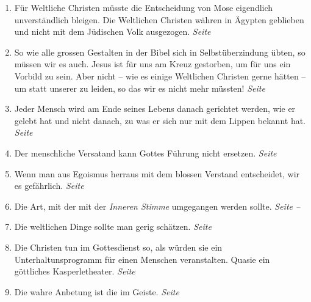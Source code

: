 \begin{enumerate}
 \item Für Weltliche Christen müsste die Entscheidung von Mose eigendlich
unverständlich bleigen. Die Weltlichen Christen währen in Ägypten geblieben und
nicht mit dem Jüdischen Volk ausgezogen.
 \dotfill \textit{Seite \pageref{ref:04_17_mose}}\\
 
 \item So wie alle grossen Gestalten in der Bibel sich in Selbstüberzindung
übten, so müssen wir es auch. Jesus ist für uns am Kreuz gestorben, um für uns
ein Vorbild zu sein. Aber nicht -- wie es einige Weltlichen Christen gerne
hätten -- um statt unserer zu leiden, so das wir es nicht mehr müssten!
 \dotfill \textit{Seite \pageref{ref:04_20_opfertod}}\\
 
 \item Jeder Mensch wird am Ende seines Lebens danach gerichtet werden, wie er
gelebt hat und nicht danach, zu was er sich nur mit dem Lippen bekannt hat.
 \dotfill \textit{Seite \pageref{ref:04_21_gericht}}\\
 
 \item Der menschliche Versatand kann Gottes Führung nicht ersetzen.
 \dotfill \textit{Seite \pageref{ref:04_22_vernunft}}\\
 
 \item Wenn man aus Egoismus herraus mit dem blossen Verstand entscheidet, wir
es gefährlich.
 \dotfill \textit{Seite \pageref{ref:04_22_vernunft_und_ego}}\\
 
 \item Die Art, mit der mit der \textit{Inneren Stimme} umgegangen werden
sollte.
 \dotfill \textit{Seite \pageref{ref:04_23_innere_stimme} --
\pageref{ref:04_23_innere_stimme_ende}}\\

 \item Die weltlichen Dinge sollte man gerig schätzen.
 \dotfill \textit{Seite \pageref{ref:04_23_dinge_der_welt}}\\
 
 \item Die Christen tun im Gottesdienst so, als würden sie ein
Unterhaltunsprogramm
 für einen Menschen veranstalten. Quasie ein göttliches Kasperletheater.
 \dotfill \textit{Seite \pageref{ref:05_02_kasperletheater}}\\
 
 \item Die wahre Anbetung ist die im Geiste.
 \dotfill \textit{Seite \pageref{ref:05_04_wahre_anbetung}}\\
 

\end{enumerate}
